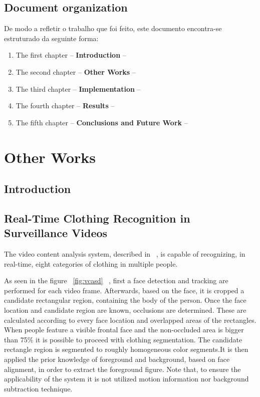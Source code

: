 \documentclass[titlepage,12pt,a4paper,times]{book}
\begin{document}
\section{Document organization}
\label{sec:organ}
De modo a refletir o trabalho que foi feito, este documento encontra-se
estruturado da seguinte forma:
\begin{enumerate}
\item The first chapter -- \textbf{Introduction} --
\item The second chapter -- \textbf{Other Works} --
\item The third chapter -- \textbf{Implementation} --
\item The fourth chapter -- \textbf{Results} --
\item The fifth chapter -- \textbf{Conclusions and Future Work} --
\end{enumerate}

\chapter{Other Works}
\label{chap:ow}

\section{Introduction}
\label{chap2:sec:intro}

\section{Real-Time Clothing Recognition in Surveillance Videos}
\label{chap2:sec:art1}

The video content analysis system, described in ~\citep{1}, is capable of
recognizing, in real-time, eight categories of clothing in multiple people.

As seen in the figure ~\ref{fig:vcasd} ~\citep{1}, first a face detection and
tracking are performed for each video frame. Afterwards, based on the face,
it is cropped a candidate rectangular region, containing the body of the
person. Once the face location and candidate region are known, occlusions are
determined. These are calculated according to every face location and
overlapped areas of the rectangles. When people feature a visible frontal
face and the non-occluded area is bigger than 75\% it is possible to proceed
with clothing segmentation. The candidate rectangle region is segmented to
roughly homogeneous color segments.It is then applied the prior knowledge of
foreground and background, based on face alignment, in order to extract the
foreground figure. Note that, to ensure the applicability of the system it is
not utilized motion information nor background subtraction technique.
\end{document}
